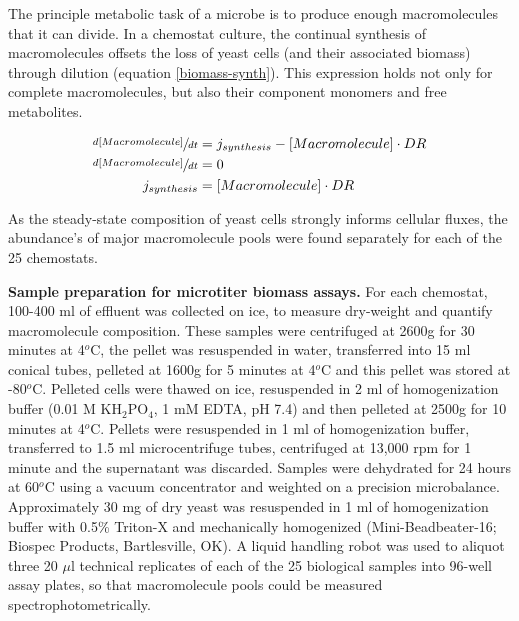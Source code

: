 \documentclass[12pt]{nature}\usepackage{graphicx, color}
\begin{document}
The principle metabolic task of a microbe is to produce enough macromolecules that it can divide.  In a chemostat culture, the continual synthesis of macromolecules offsets the loss of yeast cells (and their associated biomass) through dilution (equation \ref{biomass-synth}).  This expression holds not only for complete macromolecules, but also their component monomers and free metabolites.  

\begin{align}
\sfrac{d[Macromolecule]}{dt} &= j_{synthesis} - [Macromolecule] \cdot DR\notag\\
\sfrac{d[Macromolecule]}{dt} &= 0\notag\\
j_{synthesis} &= [Macromolecule] \cdot DR \label{biomass-synth}
\end{align}

As the steady-state composition of yeast cells strongly informs cellular fluxes, the abundance's of major macromolecule pools \cite{Lange:2001th} were found separately for each of the 25 chemostats.

\textbf{Sample preparation for microtiter biomass assays.} For each chemostat, 100-400 ml of effluent was collected on ice, to measure dry-weight and quantify macromolecule composition. These samples were centrifuged at 2600g for 30 minutes at 4$^{o}$C, the pellet was resuspended in water, transferred into 15 ml conical tubes, pelleted at 1600g for 5 minutes at 4$^{o}$C  and this pellet was stored at -80$^{o}$C.  Pelleted cells were thawed on ice, resuspended in 2 ml of homogenization buffer (0.01 M KH$_{2}$PO$_{4}$, 1 mM EDTA, pH 7.4) and then pelleted at 2500g for 10 minutes at 4$^{o}$C.  Pellets were resuspended in 1 ml of homogenization buffer, transferred to 1.5 ml microcentrifuge tubes, centrifuged at 13,000 rpm for 1 minute and the supernatant was discarded.  Samples were dehydrated for 24 hours at 60$^{o}$C using a vacuum concentrator and weighted on a precision microbalance. Approximately 30 mg of dry yeast was resuspended in 1 ml of homogenization buffer with 0.5\% Triton-X and mechanically homogenized (Mini-Beadbeater-16; Biospec Products, Bartlesville, OK).  A liquid handling robot was used to aliquot three 20 $\mu$l technical replicates of each of the 25 biological samples into 96-well assay plates, so that macromolecule pools could be measured spectrophotometrically.
\end{document}
